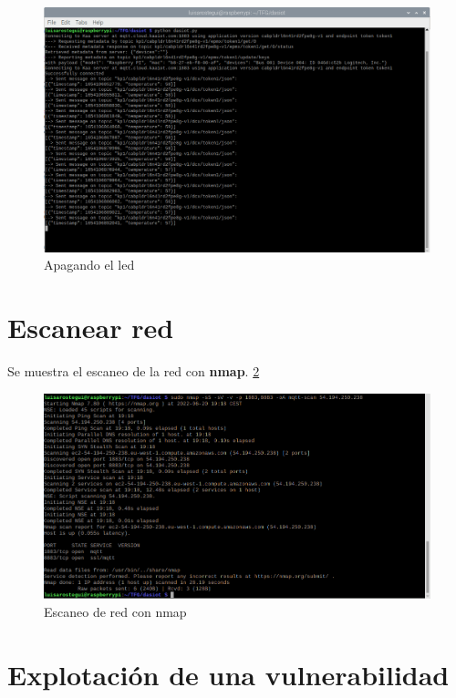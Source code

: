 \begin{figure}[p]
    \centering
    \includegraphics[width=\linewidth]{imagenes/2022-06-01-200813_1920x1080_scrot.png}
    \caption{Apagando el led}
    \label{fig:figure18}
\end{figure}

\newpage

\section{Escanear red}

Se muestra el escaneo de la red con \textbf{nmap}. \ref{fig:figure19-prueba}

\begin{figure}[p]
    \centering
    \includegraphics[width=\linewidth]{imagenes/2022-06-20-191838_1920x1080_scrot.png}
    \caption{Escaneo de red con nmap}
    \label{fig:figure19-prueba}
\end{figure}


\section{Explotación de una vulnerabilidad}

